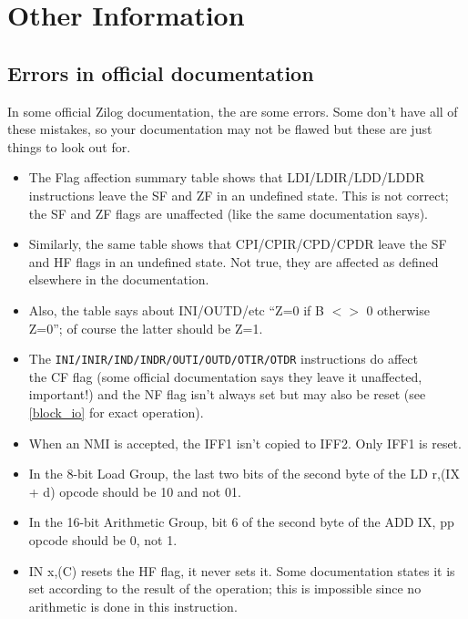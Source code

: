 \documentclass[oneside,a4paper]{book}
\begin{document}
\chapter{Other Information}

\section{Errors in official documentation}

In some official Zilog documentation, the are some errors. Some don't
have all of these mistakes, so your documentation may not be flawed but 
these are just things to look out for.

\begin{itemize}

\item
  The Flag affection summary table shows that {\ttfamily LDI/LDIR/LDD/LDDR} 
  instructions leave the SF and ZF in an undefined state. This is not correct; 
  the SF and ZF flags are unaffected (like the same documentation says).

\item
  Similarly, the same table shows that {\ttfamily CPI/CPIR/CPD/CPDR} leave the 
  SF and HF flags in an undefined state. Not true, they are affected as defined 
  elsewhere in the documentation.

\item
  Also, the table says about {\ttfamily INI/OUTD/}etc 
  ``Z=0 if B $<>$ 0 otherwise Z=0''; of course the latter should be Z=1.

\item
  The {\tt INI/INIR/IND/INDR/OUTI/OUTD/OTIR/OTDR} instructions do affect\\
  the CF flag (some official documentation says they 
  leave it unaffected, important!) and the NF flag isn't always set but may 
  also be reset (see \ref{block_io} for exact operation).

\item
  When an NMI is accepted, the IFF1 isn't copied to IFF2. Only IFF1
  is reset.

\item
  In the 8-bit Load Group, the last two bits of the second byte of
  the {\ttfamily LD r,(IX + d)} opcode should be 10 and not 01.

\item
  In the 16-bit Arithmetic Group, bit 6 of the second byte of the
  {\ttfamily ADD IX, pp} opcode should be 0, not 1.

\item
  {\ttfamily IN x,(C)} resets the HF flag, it never sets it. Some 
  documentation states it is set according to the result of the operation; 
  this is impossible since no arithmetic is done in this instruction.
\end{itemize}
\end{document}
